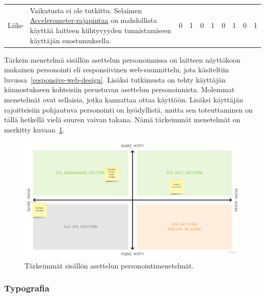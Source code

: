 \documentclass[finnish, 12pt, a4paper, elec, utf8, a-1b, online]{aaltothesis}
\begin{document}
{\begin{longtable}{p{2.5cm}|p{6cm}|p{0.5cm}p{0.5cm}p{0.5cm}|p{0.5cm}|p{0.5cm}p{0.5cm}p{0.5cm}|p{0.5cm}|}
    \midrule
    Liike                                  & Vaikutusta ei ole tutkittu. Selaimen \href{https://developer.mozilla.org/en-US/docs/Web/API/Accelerometer}{Accelerometer-rajapintaa} on mahdollista käyttää laitteen kiihtyvyyden tunnistamiseen käyttäjän suostumuksella.                                                                                                              & 0                                          & 1                                   & 0                                      & 1                            & 0                                               & 1                                         & 0                                         & 1                            \\
\end{longtable}
}

Tärkein menetelmä sisällön asettelun personoinnissa on laitteen näyttökoon
mukainen personointi eli responsiivinen web-suunnittelu, jota käsiteltiin
luvussa~\ref{responsive-web-design}. Lisäksi tutkimusta on tehty käyttäjän
kiinnostukseen kohteisiin perustuvan asettelun personoinnista. Molemmat
menetelmät ovat sellaisia, jotka kannattaa ottaa käyttöön. Lisäksi käyttäjän
rajoitteisiin pohjautuva personointi on hyödyllistä, mutta sen toteuttaminen on
tällä hetkellä vielä suuren vaivan takana. Nämä tärkeimmät menetelmät on
merkitty kuvaan~\ref{fig:layout-priorization}.

\begin{figure}[htb]
    \centering
    \includegraphics[width=\textwidth]{images/layout-priorization.pdf}
    \caption{Tärkeimmät sisällön asettelun personointimenetelmät.~\label{fig:layout-priorization}}
\end{figure}

\subsubsection{Typografia}
\end{document}
